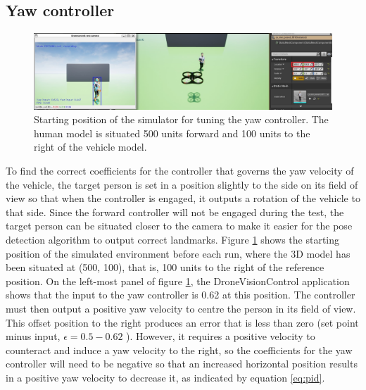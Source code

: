 \subsection{Yaw controller}

\begin{figure}
  \centering
  \includegraphics[width=\textwidth, keepaspectratio]{img/pid/tune-ref-pos-yaw.jpg}
  \caption{Starting position of the simulator for tuning the yaw controller. The human model is situated 500 units forward and 100 units to the right of the vehicle model.}
  \label{fig:tune-ref-pos-yaw}
\end{figure}

To find the correct coefficients for the controller that governs the yaw velocity of the vehicle, the target person is set in a position slightly to the side on its field of view so that when the controller is engaged, it outputs a rotation of the vehicle to that side.
Since the forward controller will not be engaged during the test, the target person can be situated closer to the camera to make it easier for the pose detection algorithm to output correct landmarks.
Figure \ref{fig:tune-ref-pos-yaw} shows the starting position of the simulated environment before each run, where the 3D model has been situated at (500, 100), that is, 100 units to the right of the reference position.
On the left-most panel of figure \ref{fig:tune-ref-pos-yaw}, the DroneVisionControl application shows that the input to the yaw controller is 0.62 at this position.
The controller must then output a positive yaw velocity to centre the person in its field of view. 
This offset position to the right produces an error that is less than zero (set point minus input, $\epsilon = 0.5 - 0.62$ ).
However, it requires a positive velocity to counteract and induce a yaw velocity to the right, so the coefficients for the yaw controller will need to be negative so that an increased horizontal position results in a positive yaw velocity to decrease it, as indicated by equation \ref{eq:pid}.
 

